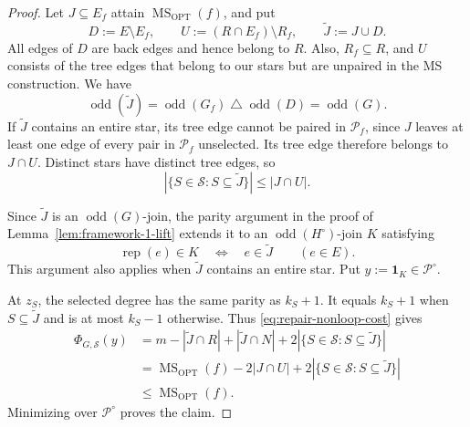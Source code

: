 \documentclass[11pt]{amsart}
\DeclareMathOperator{\odd}{odd}
\newcommand{\rep}[1]{\operatorname{rep}(#1)}
\newcommand{\1}{\mathbbm{1}}
\newcommand{\MSopt}{\operatorname{MS}_{\mathrm{OPT}}}
\begin{document}
\begin{proof}
Let $J\subseteq E_f$ attain $\MSopt(f)$, and put
\[
 D:=E\setminus E_f,\qquad
 U:=(R\cap E_f)\setminus R_f,\qquad
 \widetilde J:=J\cup D.
\]
All edges of $D$ are back edges and hence belong to $R$.
Also, $R_f\subseteq R$, and $U$ consists of the tree edges
that belong to our stars but are unpaired in the MS construction.
We have
\[
 \odd(\widetilde J)
 =\odd(G_f)\mathbin{\triangle}\odd(D)=\odd(G).
\]
If $\widetilde J$ contains an entire star, its tree edge cannot
be paired in $\mathcal P_f$, since $J$ leaves at least one
edge of every pair in $\mathcal P_f$ unselected. Its tree edge therefore
belongs to $J\cap U$. Distinct stars have distinct tree edges,
so
\[
 |\{S\in\mathcal S:S\subseteq\widetilde J\}|
 \le |J\cap U|.
\]

Since $\widetilde J$ is an $\odd(G)$-join, the parity argument
in the proof of Lemma~\ref{lem:framework-1-lift} extends it
to an $\odd(H^\circ)$-join $K$ satisfying
\[
 \rep{e}\in K\quad\Longleftrightarrow\quad e\in\widetilde J
 \qquad(e\in E).
\]
This argument also applies when $\widetilde J$ contains an
entire star. Put $y:=\mathbf{1}_K\in{\mathcal P^\circ}$.

At $z_S$, the selected degree has the same parity as $k_S+1$.
It equals $k_S+1$ when $S\subseteq\widetilde J$ and is at most
$k_S-1$ otherwise. Thus \eqref{eq:repair-nonloop-cost} gives
\[
\begin{aligned}
 \Phi_{G,\mathcal S}(y)
 &=m-|\widetilde J\cap R|+|\widetilde J\cap N|
      +2|\{S\in\mathcal S:S\subseteq\widetilde J\}|\\
 &=\MSopt(f)-2|J\cap U|
      +2|\{S\in\mathcal S:S\subseteq\widetilde J\}|\\
 &\le\MSopt(f).
\end{aligned}
\]
Minimizing over ${\mathcal P^\circ}$ proves the claim.
\end{proof}
\end{document}
